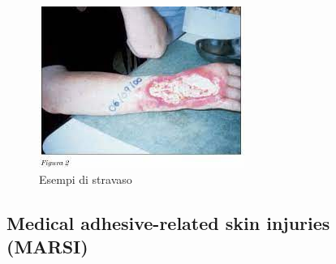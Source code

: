 \begin{figure}[H]
    \begin{center}
    \includegraphics[width=0.5\columnwidth]{img/stravaso2.jpeg}
    \end{center}
    \caption[Esempi di stravaso]{Esempi di stravaso
    \cite{img57}}

\end{figure}

\subsection{Medical adhesive-related skin injuries (MARSI)}


